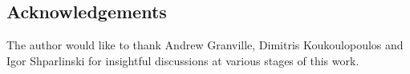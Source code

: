 \documentclass[12pt]{amsart}
\theoremstyle{remark}
\begin{document}
\subsection*{Acknowledgements}

The author would like to thank Andrew Granville, Dimitris Koukoulopoulos and Igor Shparlinski for insightful discussions at various stages of this work.





{}
\end{document}
